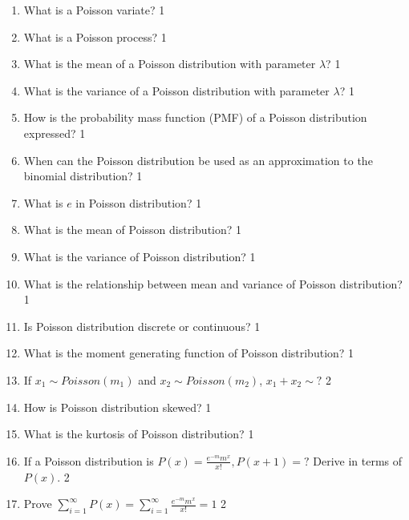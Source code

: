 \documentclass[a4paper,oneside, margin=1.4in]{book}
\begin{document}
\begin{enumerate}

  \item What is a Poisson variate? \hfill 1
  
  \item What is a Poisson process?  \hfill 1
  
  \item What is the mean of a Poisson distribution with parameter \( \lambda \)? \hfill 1

\item What is the variance of a Poisson distribution with parameter \( \lambda \)? \hfill 1

\item How is the probability mass function (PMF) of a Poisson distribution expressed? \hfill 1

\item When can the Poisson distribution be used as an approximation to the binomial distribution? \hfill 1

\item What is $e$ in Poisson distribution? \hfill 1

\item What is the mean of Poisson distribution? \hfill 1

\item What is the variance of Poisson distribution? \hfill 1

\item What is the relationship between mean and variance of Poisson distribution? \hfill 1

\item Is Poisson distribution discrete or continuous? \hfill 1

\item What is the moment generating function of Poisson distribution? \hfill 1

\item If $x_1 \sim Poisson (m_1)$ and  $x_2 \sim Poisson (m_2)$,  $x_1 + x_2 \sim ?$ \hfill 2

\item How is Poisson distribution skewed? \hfill 1

\item What is the kurtosis of Poisson distribution? \hfill 1

\item If a Poisson distribution is $P(x) = \frac{e^{-m}m^x}{x!}, P(x+1) = ?$ Derive in terms of $P(x)$. \hfill 2

\item Prove $\displaystyle \sum_{i=1}^{\infty} P(x) = \sum_{i=1}^{\infty} \frac{e^{-m} m^x}{x!} = 1$ \hfill 2
\end{enumerate}
\end{document}
